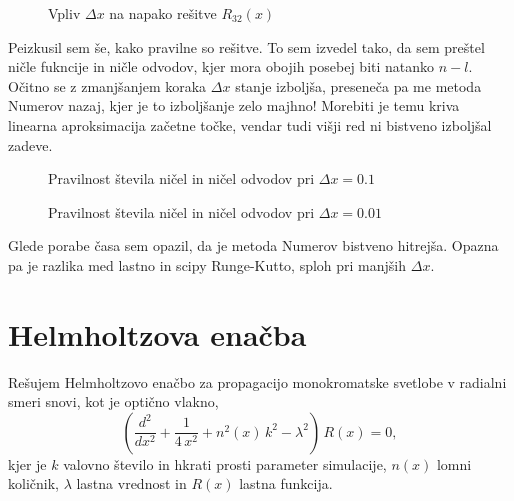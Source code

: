 \begin{figure}[H]
    \centering
    \caption{Vpliv $\Delta x$ na napako rešitve $R_{32}(x)$}
\end{figure}

Peizkusil sem še, kako pravilne so rešitve. To sem izvedel tako, da sem preštel ničle fukncije in ničle odvodov, kjer mora obojih posebej biti natanko $n-l$. Očitno se z zmanjšanjem koraka $\Delta x$ stanje izboljša, preseneča pa me metoda Numerov nazaj, kjer je to izboljšanje zelo majhno! Morebiti je temu kriva linearna aproksimacija začetne točke, vendar tudi višji red ni bistveno izboljšal zadeve.

\begin{figure}[H]
    \centering
    \caption{Pravilnost števila ničel in ničel odvodov pri $\Delta x = 0.1$}
\end{figure}

\begin{figure}[H]
    \centering
    \caption{Pravilnost števila ničel in ničel odvodov pri $\Delta x = 0.01$}
\end{figure}

Glede porabe časa sem opazil, da je metoda Numerov bistveno hitrejša. Opazna pa je razlika med lastno in scipy Runge-Kutto, sploh pri manjših $\Delta x$.


\section{Helmholtzova enačba}

Rešujem Helmholtzovo enačbo za propagacijo monokromatske svetlobe v radialni smeri snovi, kot je optično vlakno,
\begin{equation}
    \left( \frac{d^2}{dx^2} + \frac{1}{4\,x^2} + n^2(x)\,k^2 - \lambda^2 \right) \, R(x) = 0,
\end{equation}
kjer je $k$ valovno število in hkrati prosti parameter simulacije, $n(x)$ lomni količnik, $\lambda$ lastna vrednost in $R(x)$ lastna funkcija.

